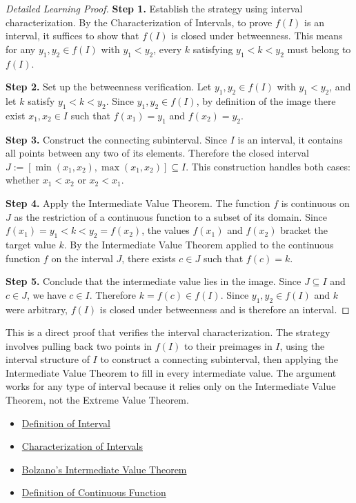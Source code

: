 \begin{proof}[Detailed Learning Proof]
\LRAProofBodyStart

\textbf{Step 1.} Establish the strategy using interval characterization.
By the Characterization of Intervals, to prove $f(I)$ is an interval, it suffices to show that $f(I)$ is closed under betweenness. This means for any $y_1, y_2 \in f(I)$ with $y_1 < y_2$, every $k$ satisfying $y_1 < k < y_2$ must belong to $f(I)$.

\textbf{Step 2.} Set up the betweenness verification.
Let $y_1, y_2 \in f(I)$ with $y_1 < y_2$, and let $k$ satisfy $y_1 < k < y_2$. Since $y_1, y_2 \in f(I)$, by definition of the image there exist $x_1, x_2 \in I$ such that $f(x_1) = y_1$ and $f(x_2) = y_2$.

\textbf{Step 3.} Construct the connecting subinterval.
Since $I$ is an interval, it contains all points between any two of its elements. Therefore the closed interval $J := [\min(x_1, x_2), \max(x_1, x_2)] \subseteq I$. This construction handles both cases: whether $x_1 < x_2$ or $x_2 < x_1$.

\textbf{Step 4.} Apply the Intermediate Value Theorem.
The function $f$ is continuous on $J$ as the restriction of a continuous function to a subset of its domain. Since $f(x_1) = y_1 < k < y_2 = f(x_2)$, the values $f(x_1)$ and $f(x_2)$ bracket the target value $k$. By the Intermediate Value Theorem applied to the continuous function $f$ on the interval $J$, there exists $c \in J$ such that $f(c) = k$.

\textbf{Step 5.} Conclude that the intermediate value lies in the image.
Since $J \subseteq I$ and $c \in J$, we have $c \in I$. Therefore $k = f(c) \in f(I)$. Since $y_1, y_2 \in f(I)$ and $k$ were arbitrary, $f(I)$ is closed under betweenness and is therefore an interval.
\end{proof}

\begin{remark*}
This is a direct proof that verifies the interval characterization. The strategy involves pulling back two points in $f(I)$ to their preimages in $I$, using the interval structure of $I$ to construct a connecting subinterval, then applying the Intermediate Value Theorem to fill in every intermediate value. The argument works for any type of interval because it relies only on the Intermediate Value Theorem, not the Extreme Value Theorem.
\end{remark*}

\begin{dependencies}
\begin{itemize}
  \item \hyperref[def:interval]{Definition of Interval}
  \item \hyperref[thm:characterization-of-intervals]{Characterization of Intervals}
  \item \hyperref[thm:bolzano-intermediate-value]{Bolzano's Intermediate Value Theorem}
  \item \hyperref[def:continuous-function]{Definition of Continuous Function}
\end{itemize}
\end{dependencies}

\clearpage
